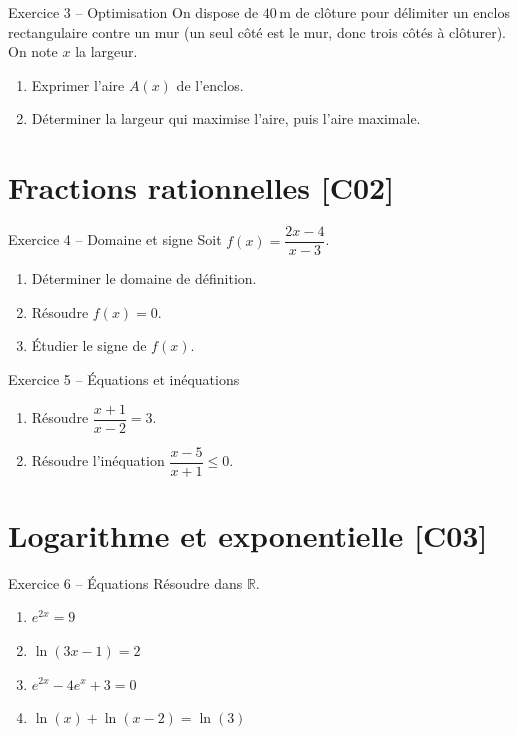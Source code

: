 \documentclass[a4paper,11pt]{article}
\begin{document}
\begin{exo}{Exercice 3 -- Optimisation}
On dispose de $40\,$m de clôture pour délimiter un enclos rectangulaire contre un mur (un seul côté est le mur, donc trois côtés à clôturer). On note $x$ la largeur.
\begin{enumerate}[label=\alph*)]
  \item Exprimer l'aire $A(x)$ de l'enclos.
  \item Déterminer la largeur qui maximise l'aire, puis l'aire maximale.
\end{enumerate}
\end{exo}

\section{Fractions rationnelles \hfill {\normalsize\color{uimmred}[C02]}}

\begin{exo}{Exercice 4 -- Domaine et signe}
Soit $f(x) = \dfrac{2x - 4}{x - 3}$.
\begin{enumerate}[label=\alph*)]
  \item Déterminer le domaine de définition.
  \item Résoudre $f(x) = 0$.
  \item Étudier le signe de $f(x)$.
\end{enumerate}
\end{exo}

\begin{exo}{Exercice 5 -- Équations et inéquations}
\begin{enumerate}[label=\alph*)]
  \item Résoudre $\dfrac{x + 1}{x - 2} = 3$.
  \item Résoudre l'inéquation $\dfrac{x - 5}{x + 1} \leq 0$.
\end{enumerate}
\end{exo}

\section{Logarithme et exponentielle \hfill {\normalsize\color{uimmred}[C03]}}

\begin{exo}{Exercice 6 -- Équations}
Résoudre dans $\mathbb{R}$.
\begin{enumerate}[label=\alph*)]
  \item $e^{2x} = 9$
  \item $\ln(3x - 1) = 2$
  \item $e^{2x} - 4e^x + 3 = 0$
  \item $\ln(x) + \ln(x - 2) = \ln(3)$
\end{enumerate}
\end{exo}
\end{document}
